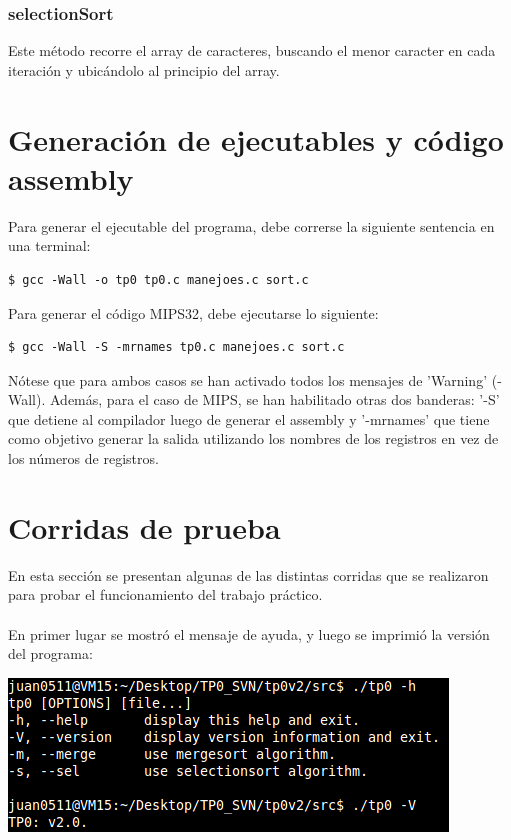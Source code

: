 \documentclass[a4paper,10pt]{article}
\begin{document}
\subsubsection{selectionSort}
Este m\'etodo recorre el array de caracteres, buscando el menor caracter en cada iteraci\'on y ubic\'andolo al principio del array.\\

\section{Generaci\'on de ejecutables y c\'odigo assembly}
Para generar el ejecutable del programa, debe correrse la siguiente sentencia en una terminal:
\begin{verbatim}
$ gcc -Wall -o tp0 tp0.c manejoes.c sort.c
\end{verbatim}

Para generar el c\'odigo MIPS32, debe ejecutarse lo siguiente:
\begin{verbatim}
$ gcc -Wall -S -mrnames tp0.c manejoes.c sort.c
\end{verbatim}

N\'otese que para ambos casos se han activado todos los mensajes de 'Warning' (-Wall). Adem\'as, para el caso de MIPS, se han habilitado otras dos banderas: '-S' que detiene al compilador luego de generar el assembly y '-mrnames' que tiene como objetivo generar la salida utilizando los nombres de los registros en vez de los n\'umeros de registros.
\pagebreak

\section{Corridas de prueba}

En esta secci\'on se presentan algunas de las distintas corridas que se realizaron para probar el funcionamiento del trabajo pr\'actico.\\
\\
En primer lugar se mostr\'o el mensaje de ayuda, y luego se imprimi\'o la versi\'on del programa:
\begin{center}
\includegraphics[scale=0.60]{1.png}
\end{center}
\end{document}
